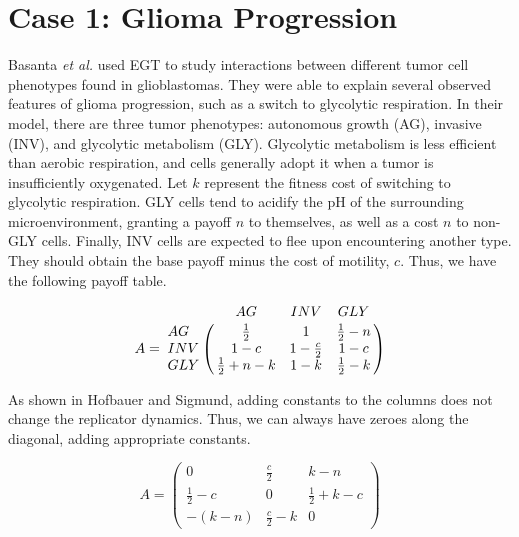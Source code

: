 \documentclass[12pt]{report}
\begin{document}
\section*{Case 1: Glioma Progression}
Basanta \textit{et al.} used EGT to study interactions between different tumor cell phenotypes found in glioblastomas. They were able to explain several observed features of glioma progression, such as a switch to glycolytic respiration. In their model, there are three tumor phenotypes: autonomous growth (AG), invasive (INV), and glycolytic metabolism (GLY). Glycolytic metabolism is less efficient than aerobic respiration, and cells generally adopt it when a tumor is insufficiently oxygenated. Let $k$ represent the fitness cost of switching to glycolytic respiration. GLY cells tend to acidify the pH of the surrounding microenvironment, granting a payoff $n$ to themselves, as well as a cost $n$ to non-GLY cells. Finally, INV cells are expected to flee upon encountering another type. They should obtain the base payoff minus the cost of motility, $c$. Thus, we have the following payoff table. 

$$A = \bordermatrix{\text{}& AG & INV & GLY\cr
                AG & \frac{1}{2} & 1 & \frac{1}{2} - n \cr
                INV & 1 - c  &  1 - \frac{c}{2} & 1 - c \cr
                GLY & \frac{1}{2}+n-k & 1-k & \frac{1}{2}-k \cr
               }$$







As shown in Hofbauer and Sigmund, adding constants to the columns does not change the replicator dynamics. Thus, we can always have zeroes along the diagonal, adding appropriate constants. 

$$ A = \begin{pmatrix}
0 & \frac{c}{2} & k - n \\
\frac{1}{2} - c & 0 &\frac{1}{2} + k - c \\
- (k - n) & \frac{c}{2} - k & 0
\end{pmatrix} $$
\end{document}
